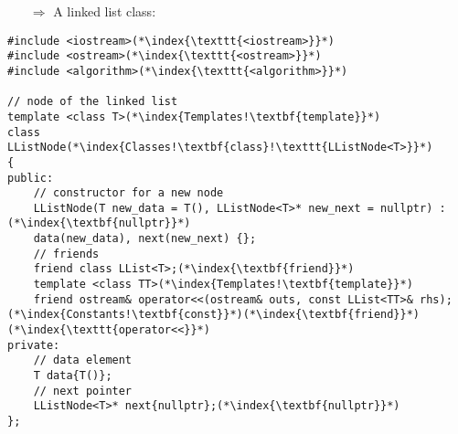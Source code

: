 \documentclass[10pt]{article}
\begin{document}
\begin{enumerate}
\item[$\Rightarrow$] A linked list class:
\end{enumerate}
\begin{lstlisting}
#include <iostream>(*\index{\texttt{<iostream>}}*)
#include <ostream>(*\index{\texttt{<ostream>}}*)
#include <algorithm>(*\index{\texttt{<algorithm>}}*)

// node of the linked list
template <class T>(*\index{Templates!\textbf{template}}*)
class LListNode(*\index{Classes!\textbf{class}!\texttt{LListNode<T>}}*)
{
public:
    // constructor for a new node
    LListNode(T new_data = T(), LListNode<T>* new_next = nullptr) :(*\index{\textbf{nullptr}}*)
    data(new_data), next(new_next) {};
    // friends
    friend class LList<T>;(*\index{\textbf{friend}}*)
    template <class TT>(*\index{Templates!\textbf{template}}*)
    friend ostream& operator<<(ostream& outs, const LList<TT>& rhs);(*\index{Constants!\textbf{const}}*)(*\index{\textbf{friend}}*)(*\index{\texttt{operator<<}}*)
private:
    // data element
    T data{T()};
    // next pointer
    LListNode<T>* next{nullptr};(*\index{\textbf{nullptr}}*)
};


\end{lstlisting}
\end{document}
